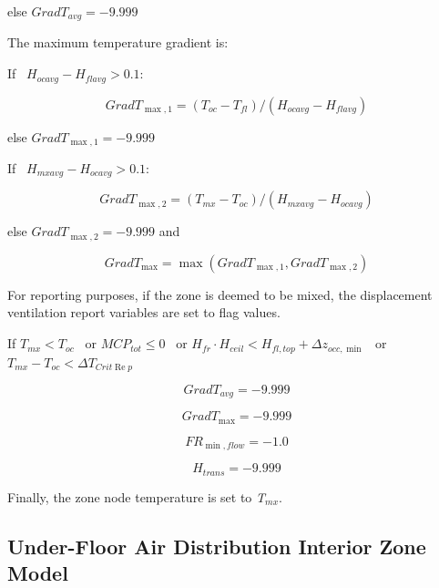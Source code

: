 else \(Grad{T_{avg}} =  - 9.999\)

The maximum temperature gradient is:

If~ \({H_{ocavg}} - {H_{flavg}} > 0.1\):

\begin{equation}
Grad{T_{\max ,1}} = ({T_{oc}} - {T_{fl}})/({H_{ocavg}} - {H_{flavg}})
\end{equation}

else \(Grad{T_{\max ,1}} = - 9.999\)

If~ \({H_{mxavg}} - {H_{ocavg}} > 0.1\):

\begin{equation}
Grad{T_{\max ,2}} = ({T_{mx}} - {T_{oc}})/({H_{mxavg}} - {H_{ocavg}})
\end{equation}

else \(Grad{T_{\max ,2}} = - 9.999\) and

\begin{equation}
Grad{T_{\max }} = \max (Grad{T_{\max ,1}},Grad{T_{\max ,2}})
\end{equation}

For reporting purposes, if the zone is deemed to be mixed, the displacement ventilation report variables are set to flag values.

If \({T_{mx}} < {T_{oc}}\) ~or \(MC{P_{tot}} \le 0\) ~or \({H_{fr}} \cdot {H_{ceil}} < {H_{fl,top}} + \Delta {z_{occ,\min }}\) ~or \({T_{mx}} - {T_{oc}} < \Delta {T_{Crit\operatorname{Re} p}}\)

\begin{equation}
Grad{T_{avg}} =  - 9.999
\end{equation}

\begin{equation}
Grad{T_{\max }} =  - 9.999
\end{equation}

\begin{equation}
F{R_{\min ,flow}} =  - 1.0
\end{equation}

\begin{equation}
{H_{trans}} =  - 9.999
\end{equation}

Finally, the zone node temperature is set to \emph{T\(_{mx}\)}.

\subsection{Under-Floor Air Distribution Interior Zone Model}\label{under-floor-air-distribution-interior-zone-model}


